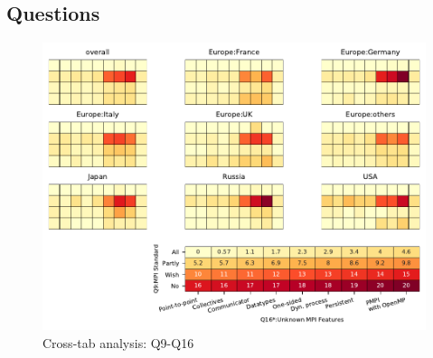 
\subsection{Questions}


\begin{figure}
\begin{center}
\includegraphics[width=12cm]{../pdfs/Q9-Q16.pdf}
\caption{Cross-tab analysis: Q9-Q16}
\label{fig:Q9-Q16}
\end{center}
\end{figure}
